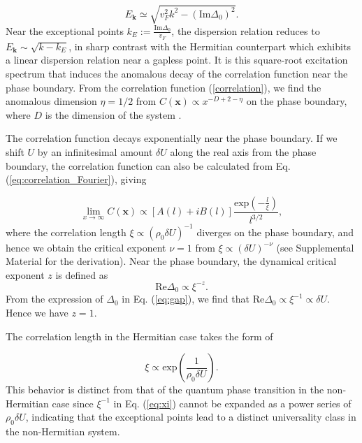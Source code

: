 \documentclass[aps,prl,twocolumn,superscriptaddress]{revtex4-1}
\begin{document}
\begin{bibunit}[apsrev4-2]
\begin{equation}
E_{\bm{k}}\simeq\sqrt{v_{F}^{2}k^{2}-(\text{Im}\Delta_0)^{2}}.
\end{equation}
Near the exceptional points $k_{E}:=\frac{\text{Im}\Delta_0}{v_{F}}$,
the dispersion relation reduces to $E_{\bm{k}}\sim\sqrt{k-k_{E}}$,
in sharp contrast with the Hermitian counterpart which exhibits 
a linear dispersion relation near a gapless point. It is this square-root
excitation spectrum that induces the anomalous decay of the correlation
function near the phase boundary. From the correlation function (\ref{correlation}),
we find the anomalous dimension $\eta=1/2$ from $C(\bm{x})\propto x^{-D+2-\eta}$
on the phase boundary, where $D$ is the dimension of the system \cite{Sachdev:2011uj}.

The correlation function decays exponentially near the phase boundary.
If we shift $U$ by an infinitesimal amount $\delta U$ along the
real axis from the phase boundary, the correlation function can also
be calculated from Eq. (\ref{eq:correlation_Fourier}), giving

\begin{equation}
\lim_{x\rightarrow\infty}C(\bm{x})\propto[A(l)+iB(l)]\frac{\text{exp}\left(-\frac{l}{\xi}\right)}{l^{3/2}},\label{eq:exponential_decay}
\end{equation}
where the correlation length $\xi\propto(\rho_{0}\delta U)^{-1}$
diverges on the phase boundary, and hence we obtain the critical exponent
$\nu=1$ from $\xi\propto(\delta U)^{-\nu}$ \cite{Sachdev:2011uj}
(see Supplemental Material \cite{SupplementaryMaterial} for the
derivation). Near the phase boundary, the dynamical critical exponent
$z$ is defined as 
\begin{equation}
\text{Re}\Delta_0\propto\xi^{-z}.
\end{equation}
From the expression of $\Delta_0$ in Eq. (\ref{eq:gap}), we find
that $\text{Re}\Delta_0\propto\xi^{-1}\propto\delta U$. Hence 
we have $z=1$.

The correlation length in the Hermitian case takes the
form of

\begin{equation}
\xi\propto\text{exp}\left(\frac{1}{\rho_{0}\delta U}\right).\label{eq:xi}
\end{equation}
This behavior is distinct from that of the quantum phase transition
in the non-Hermitian case since $\xi^{-1}$ in Eq. (\ref{eq:xi})
cannot be expanded as a power series of $\rho_{0}\delta U$, indicating that the exceptional points lead to a distinct 
universality class in the non-Hermitian system.


\end{bibunit}
\end{document}
